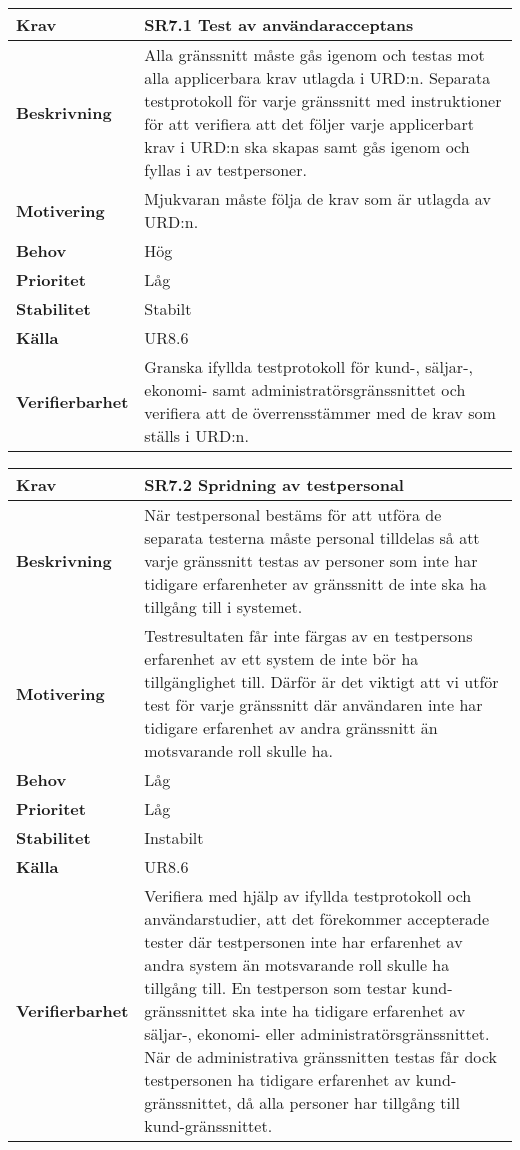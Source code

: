 \documentclass[a4paper, twoside, 11pt, titlepage]{article}
\begin{document}
	\begin{tabular} { p{2.6cm} p{12.5cm} }
		\hline
		\sffamily\textbf{Krav} & \sffamily\textbf{SR7.1 Test av användaracceptans } \\
		\hline
		\sffamily\textbf{Beskrivning} & Alla gränssnitt måste gås igenom och testas mot alla applicerbara krav utlagda i URD:n. Separata testprotokoll för varje gränssnitt med instruktioner för att verifiera att det följer varje applicerbart krav i URD:n ska skapas samt gås igenom och fyllas i av testpersoner.  \\
		\hline
		\sffamily\textbf{Motivering} & Mjukvaran måste följa de krav som är utlagda av URD:n.  \\
		\hline
		\sffamily\textbf{Behov} & Hög  \\
		\hline
		\sffamily\textbf{Prioritet} & Låg  \\
		\hline
		\sffamily\textbf{Stabilitet} & Stabilt  \\
		\hline
		\sffamily\textbf{Källa} & UR8.6  \\
		\hline
		\sffamily\textbf{Verifierbarhet} & Granska ifyllda testprotokoll för kund-, säljar-, ekonomi- samt administratörsgränssnittet och verifiera att de överrensstämmer med de krav som ställs i URD:n.  \\
		\hline
	\end{tabular}
	\vspace{6mm}

	\begin{tabular} { p{2.6cm} p{12.5cm} }
		\hline
		\sffamily\textbf{Krav} & \sffamily\textbf{SR7.2 Spridning av testpersonal } \\
		\hline
		\sffamily\textbf{Beskrivning} & När testpersonal bestäms för att utföra de separata testerna måste personal tilldelas så att varje gränssnitt testas av personer som inte har tidigare erfarenheter av gränssnitt de inte ska ha tillgång till i systemet.  \\
		\hline
		\sffamily\textbf{Motivering} & Testresultaten får inte färgas av en testpersons erfarenhet av ett system de inte bör ha tillgänglighet till. Därför är det viktigt att vi utför test för varje gränssnitt där användaren inte har tidigare erfarenhet av andra gränssnitt än motsvarande roll skulle ha.  \\
		\hline
		\sffamily\textbf{Behov} & Låg  \\
		\hline
		\sffamily\textbf{Prioritet} & Låg  \\
		\hline
		\sffamily\textbf{Stabilitet} & Instabilt  \\
		\hline
		\sffamily\textbf{Källa} & UR8.6  \\
		\hline
		\sffamily\textbf{Verifierbarhet} & Verifiera med hjälp av ifyllda testprotokoll och användarstudier, att det förekommer accepterade tester där testpersonen inte har erfarenhet av andra system än motsvarande roll skulle ha tillgång till.  En testperson som testar kund-gränssnittet ska inte ha tidigare erfarenhet av säljar-, ekonomi- eller administratörsgränssnittet. När de administrativa gränssnitten testas får dock  testpersonen ha tidigare erfarenhet av kund-gränssnittet, då alla personer har tillgång till kund-gränssnittet.  \\
		\hline
	\end{tabular}
\end{document}
